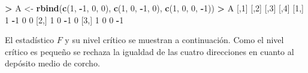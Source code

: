\documentclass[
  a4paper,
  oneside]{scrbook}
\newenvironment{Shaded}{\begin{snugshade}}{\end{snugshade}}
\newcommand{\DecValTok}[1]{\textcolor[rgb]{0.00,0.00,0.81}{#1}}
\newcommand{\FunctionTok}[1]{\textcolor[rgb]{0.13,0.29,0.53}{\textbf{#1}}}
\newcommand{\NormalTok}[1]{#1}
\newcommand{\OtherTok}[1]{\textcolor[rgb]{0.56,0.35,0.01}{#1}}
\newcommand{\SpecialCharTok}[1]{\textcolor[rgb]{0.81,0.36,0.00}{\textbf{#1}}}
\theoremstyle{definition}
\theoremstyle{definition}
\theoremstyle{definition}
\theoremstyle{definition}
\theoremstyle{remark}
\begin{document}
\begin{Shaded}
\begin{Highlighting}[]
\SpecialCharTok{\textgreater{}}\NormalTok{ A }\OtherTok{\textless{}{-}} \FunctionTok{rbind}\NormalTok{(}\FunctionTok{c}\NormalTok{(}\DecValTok{1}\NormalTok{, }\SpecialCharTok{{-}}\DecValTok{1}\NormalTok{, }\DecValTok{0}\NormalTok{, }\DecValTok{0}\NormalTok{), }\FunctionTok{c}\NormalTok{(}\DecValTok{1}\NormalTok{, }\DecValTok{0}\NormalTok{, }\SpecialCharTok{{-}}\DecValTok{1}\NormalTok{, }\DecValTok{0}\NormalTok{), }\FunctionTok{c}\NormalTok{(}\DecValTok{1}\NormalTok{, }\DecValTok{0}\NormalTok{, }\DecValTok{0}\NormalTok{, }\SpecialCharTok{{-}}\DecValTok{1}\NormalTok{))}
\SpecialCharTok{\textgreater{}}\NormalTok{ A}
\NormalTok{     [,}\DecValTok{1}\NormalTok{] [,}\DecValTok{2}\NormalTok{] [,}\DecValTok{3}\NormalTok{] [,}\DecValTok{4}\NormalTok{]}
\NormalTok{[}\DecValTok{1}\NormalTok{,]    }\DecValTok{1}   \SpecialCharTok{{-}}\DecValTok{1}    \DecValTok{0}    \DecValTok{0}
\NormalTok{[}\DecValTok{2}\NormalTok{,]    }\DecValTok{1}    \DecValTok{0}   \SpecialCharTok{{-}}\DecValTok{1}    \DecValTok{0}
\NormalTok{[}\DecValTok{3}\NormalTok{,]    }\DecValTok{1}    \DecValTok{0}    \DecValTok{0}   \SpecialCharTok{{-}}\DecValTok{1}
\end{Highlighting}
\end{Shaded}

\normalsize

El estadístico \(F\) y su nivel crítico se muestran a continuación. Como
el nivel crítico es pequeño se rechaza la igualdad de las cuatro
direcciones en cuanto al depósito medio de corcho.

\footnotesize
\end{document}
